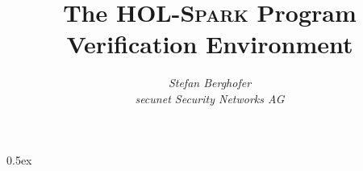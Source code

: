 \documentclass[12pt,a4paper]{report}
\newcommand{\SPARK}{\textsc{Spark}}
\begin{document}
\title{The HOL-\SPARK{} Program Verification Environment}
\author{\emph{Stefan Berghofer} \\ \emph{secunet Security Networks AG}}
\maketitle

\tableofcontents

\parindent 0pt\parskip 0.5ex








\end{document}
